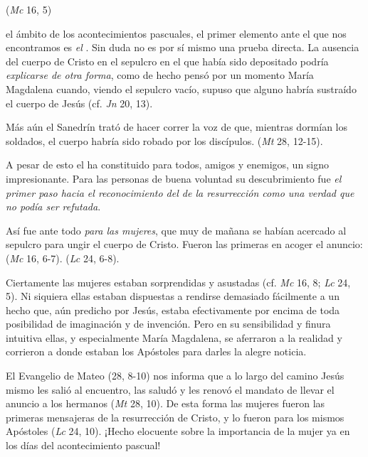 \begin{body}
 (\textit{Mc} 16, 5)

 el ámbito de los acontecimientos pascuales, el primer elemento ante el que nos encontramos es \textit{el }. Sin duda no es por sí mismo una prueba directa. La ausencia del cuerpo de Cristo en el sepulcro en el que había sido depositado podría \textit{explicarse de otra forma}, como de hecho pensó por un momento María Magdalena cuando, viendo el sepulcro vacío, supuso que alguno habría sustraído el cuerpo de Jesús (cf. \textit{Jn} 20, 13).

Más aún el Sanedrín trató de hacer correr la voz de que, mientras dormían los soldados, el cuerpo habría sido robado por los discípulos.  (\textit{Mt} 28, 12-15).

A pesar de esto el  ha constituido para todos, amigos y enemigos, un signo impresionante. Para las personas de buena voluntad su descubrimiento fue \textit{el primer paso hacia el reconocimiento del  de la resurrección como una verdad que no podía ser refutada}.

Así fue ante todo \textit{para las mujeres}, que muy de mañana se habían acercado al sepulcro para ungir el cuerpo de Cristo. Fueron las primeras en acoger el anuncio:  (\textit{Mc} 16, 6-7).  (\textit{Lc} 24, 6-8).

Ciertamente las mujeres estaban sorprendidas y asustadas (cf. \textit{Mc} 16, 8; \textit{Lc} 24, 5). Ni siquiera ellas estaban dispuestas a rendirse demasiado fácilmente a un hecho que, aún predicho por Jesús, estaba efectivamente por encima de toda posibilidad de imaginación y de invención. Pero en su sensibilidad y finura intuitiva ellas, y especialmente María Magdalena, se aferraron a la realidad y corrieron a donde estaban los Apóstoles para darles la alegre noticia.

El Evangelio de Mateo (28, 8-10) nos informa que a lo largo del camino Jesús mismo les salió al encuentro, las saludó y les renovó el mandato de llevar el anuncio a los hermanos (\textit{Mt} 28, 10). De esta forma las mujeres fueron las primeras mensajeras de la resurrección de Cristo, y lo fueron para los mismos Apóstoles (\textit{Lc} 24, 10). ¡Hecho elocuente sobre la importancia de la mujer ya en los días del acontecimiento pascual!


\end{body}
